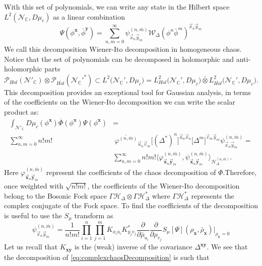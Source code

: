 \documentclass{elsarticle}%
\begin{document}
 With this set of polynomials, we can write any state in the Hilbert space $L^2(\mathcal{N}_\mathbb{C}, D\mu_c) $ as a linear combination 
    \begin{equation}
    \label{eq:ComplexWienerItodec}
    \Psi(\phi^{\mathbf{x}},\bar\phi^\mathbf{y})=\sum_{n,m=0}^\infty \psi^{(n,\bar{m})}_{\vec{x}_n\vec{y}_m} \mathcal{W}_\Delta(\phi^n\bar{\phi}^m)^{\vec{x}_n\vec{y}_m}
    \end{equation}
    We call this decomposition Wiener-Ito decomposition in homogeneous chaos.
    Notice that the set of polynomials can be decomposed in holomorphic and anti-holomorphic parts 
    \begin{equation}
    \label{eq:ComplexPolinomials}
    \mathcal{P}_{Hol}(\mathcal{N}'_{\mathbb{C}})\otimes \mathcal{P}_{\overline{Hol}}({\mathcal{N}_{\mathbb{C}}'}^*)\subset L^2\big({\mathcal{N}_{\mathbb{C}}'},D\mu_c\big)= L^2_{Hol}\big({\mathcal{N}_{\mathbb{C}}'}, D\mu_c\big)\bar{\otimes} L^2_{\overline{Hol}}\big({\mathcal{N}_{\mathbb{C}}'}, D\mu_c\big).
    \end{equation}
    This decomposition provides an exceptional tool for Gaussian analysis, in terms of the coefficients on the Wiener-Ito decomposition we can write the scalar product as:
    \begin{align}
    \label{eq:complexchaosDecomposition}
    \int_{\mathcal{N}'_\mathbb{C}}D\mu_c(\phi^\mathbf{x})\overline{\Phi}(\phi^\mathbf{x})\Psi(\phi^\mathbf{x})
    &= \nonumber \\ \sum_{n,m=0}^\infty n!m!&\ \overline{\varphi^{(n,\bar{m})}}_{\vec{u}_n\vec{v}_m}\big[(\Delta^*)^n\big]^{\vec{u}_n\vec{x}_n} \big[\Delta^m\big]^{\vec{v}_m\vec{y}_m} \psi^{(n,\bar{m})}_{\vec{x}_n\vec{y}_m}
    =\nonumber \\ &
    \sum_{n,m=0}^\infty n!m! \big\langle\varphi^{(n,\bar{m})}_{\vec{\mathbf{x}}_n\vec{\mathbf{y}}_m},\psi^{(n,\bar{m})}_{\vec{\mathbf{x}}_n\vec{\mathbf{y}}_m}\big\rangle_{\mathcal{H}^{(n,\bar{m})}_\Delta}.
    \end{align}
   Here $\varphi^{(n,\bar{m})}_{{\vec{\mathbf{x}}_n\vec{\mathbf{y}}_m}}$ represent the coefficients of the chaos decomposition of $\Phi$.Therefore, once weighted with $\sqrt{n!m!}$, the coefficients  of the Wiener-Ito decomposition belong to the Bosonic Fock space $\Gamma\mathcal{H}_\Delta\otimes{\Gamma\mathcal{H}_\Delta^*}$ where ${\Gamma\mathcal{H}_\Delta^*}$ represents the complex conjugate of the Fock space.  To find the coefficients of the decomposition is useful to use the $S_{\mu}$ transform as
    \begin{equation}
    \label{eq:wienerItoSeagalwithTtransform}
    \psi^{(n,\bar{m})}_{\vec{x}_n\vec{y}_m}=\frac{1}{n!m!}\prod_{i=1}^n\prod_{j=1}^m K_{x_iu_i}K^*_{y_jv_j}\frac{\partial}{\partial \bar\rho_{u_i}}\frac{\partial}{\partial \rho_{v_j}}  {S_\mu[\Psi](\rho_\mathbf{x},\bar{\rho}_\mathbf{x})} \bigg\lvert_{\rho_\mathbf{x}=0}
    \end{equation}
    Let us recall that $K_{\mathbf{xy}}$ is the  (weak) inverse of the covariance $\Delta^{\mathbf{xy}}$.
     We see that the decomposition of \eqref{eq:complexchaosDecomposition} is such that
     
\end{document}
